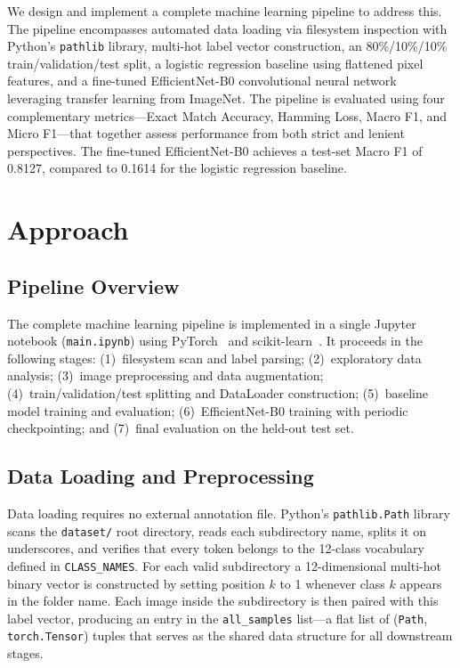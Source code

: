 \documentclass[10pt]{article}
\begin{document}
We design and implement a complete machine learning pipeline to address this.  The
pipeline encompasses automated data loading via filesystem inspection with Python's
\texttt{pathlib} library, multi-hot label vector construction, an 80\%/10\%/10\%
train/validation/test split, a logistic regression baseline using flattened pixel features, and a
fine-tuned EfficientNet-B0 convolutional neural network~\cite{tan2019efficientnet} leveraging
transfer learning from ImageNet.  The pipeline is evaluated using four complementary
metrics---Exact Match Accuracy, Hamming Loss, Macro F1, and Micro F1---that together assess
performance from both strict and lenient perspectives.  The fine-tuned EfficientNet-B0 achieves a
test-set Macro F1 of 0.8127, compared to 0.1614 for the logistic regression baseline.


\section{Approach}

\subsection*{Pipeline Overview}

The complete machine learning pipeline is implemented in a single Jupyter notebook
(\texttt{main.ipynb}) using PyTorch~\cite{paszke2019pytorch} and
scikit-learn~\cite{pedregosa2011scikit}.  It proceeds in the following stages:
(1)~filesystem scan and label parsing;
(2)~exploratory data analysis;
(3)~image preprocessing and data augmentation;
(4)~train/validation/test splitting and DataLoader construction;
(5)~baseline model training and evaluation;
(6)~EfficientNet-B0 training with periodic checkpointing; and
(7)~final evaluation on the held-out test set.

\subsection*{Data Loading and Preprocessing}

Data loading requires no external annotation file.  Python's \texttt{pathlib.Path} library scans
the \texttt{dataset/} root directory, reads each subdirectory name, splits it on underscores, and
verifies that every token belongs to the 12-class vocabulary defined in \texttt{CLASS\_NAMES}.
For each valid subdirectory a 12-dimensional multi-hot binary vector is constructed by setting
position $k$ to 1 whenever class $k$ appears in the folder name.  Each image inside the
subdirectory is then paired with this label vector, producing an entry in the
\texttt{all\_samples} list---a flat list of (\texttt{Path}, \texttt{torch.Tensor}) tuples that
serves as the shared data structure for all downstream stages.
\end{document}
